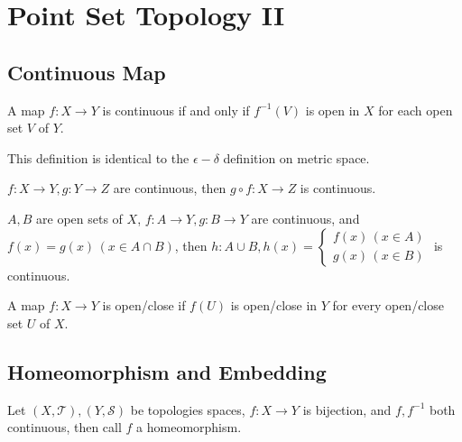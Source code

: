 
\section{Point Set Topology II}

\subsection{Continuous Map}
\begin{defi}[continuous]
A map $f : X \to Y$ is continuous if and only if $f^{-1}(V)$ is open in $X$ for
each open set $V$ of $Y$.
\end{defi}
\begin{rem}
This definition is identical to the $\epsilon-\delta$ definition on metric space.
\end{rem}
\begin{pro}
$f : X \to Y, g : Y \to Z$ are continuous, then $g \circ f : X \to Z$ is continuous.
\end{pro}
\begin{lem}
$A, B$ are open sets of $X$, $f : A \to Y, g : B \to Y$ are continuous, and $f(x) = g(x) \,(x \in A \cap B)$,
then $h : A \cup B, h(x) = \begin{cases}f(x)\,(x \in A) \\ g(x)\,(x \in B)\end{cases}$ is continuous.
\end{lem}

\begin{defi}
A map $f : X \to Y$ is open/close if $f(U)$ is open/close in $Y$ for every
open/close set $U$ of $X$.
\end{defi}

\subsection{Homeomorphism and Embedding}
\begin{defi}
Let $(X, \mathcal{T}), (Y, \mathcal{S})$ be topologies spaces,
$f : X \to Y$ is bijection, and $f, f^{-1}$ both continuous,
then call $f$ a homeomorphism.
\end{defi}


